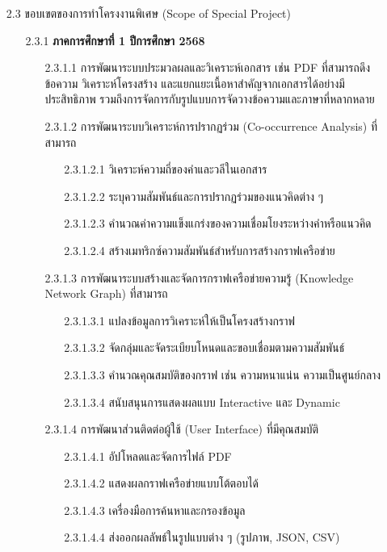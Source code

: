 \documentclass[12pt,a4paper]{article}
\newcommand{\textlight}[1]{{\thailightfont #1}}
\begin{document}
\begin{enumerate}[leftmargin=2cm]
    \item[2.3] ขอบเขตของการทำโครงงานพิเศษ (Scope of Special Project)
    \vspace{0.05cm}
    \textlight{
        \begin{enumerate}
            \item[2.3.1] \textbf{ภาคการศึกษาที่ 1 ปีการศึกษา 2568}
            \begin{enumerate}
                \item[2.3.1.1] การพัฒนาระบบประมวลผลและวิเคราะห์เอกสาร เช่น PDF ที่สามารถดึงข้อความ วิเคราะห์โครงสร้าง และแยกแยะเนื้อหาสำคัญจากเอกสารได้อย่างมีประสิทธิภาพ รวมถึงการจัดการกับรูปแบบการจัดวางข้อความและภาษาที่หลากหลาย
                \item[2.3.1.2] การพัฒนาระบบวิเคราะห์การปรากฏร่วม (Co-occurrence Analysis) ที่สามารถ
                \begin{enumerate}
                    \item[2.3.1.2.1] วิเคราะห์ความถี่ของคำและวลีในเอกสาร
                    \item[2.3.1.2.2] ระบุความสัมพันธ์และการปรากฏร่วมของแนวคิดต่าง ๆ
                    \item[2.3.1.2.3] คำนวณค่าความแข็งแกร่งของความเชื่อมโยงระหว่างคำหรือแนวคิด
                    \item[2.3.1.2.4] สร้างเมทริกซ์ความสัมพันธ์สำหรับการสร้างกราฟเครือข่าย
                \end{enumerate}
                \item[2.3.1.3] การพัฒนาระบบสร้างและจัดการกราฟเครือข่ายความรู้ (Knowledge Network Graph) ที่สามารถ
                \begin{enumerate}
                    \item[2.3.1.3.1] แปลงข้อมูลการวิเคราะห์ให้เป็นโครงสร้างกราฟ
                    \item[2.3.1.3.2] จัดกลุ่มและจัดระเบียบโหนดและขอบเชื่อมตามความสัมพันธ์
                    \item[2.3.1.3.3] คำนวณคุณสมบัติของกราฟ เช่น ความหนาแน่น ความเป็นศูนย์กลาง
                    \item[2.3.1.3.4] สนับสนุนการแสดงผลแบบ Interactive และ Dynamic
                \end{enumerate}
                \item[2.3.1.4] การพัฒนาส่วนติดต่อผู้ใช้ (User Interface) ที่มีคุณสมบัติ
                \begin{enumerate}
                    \item[2.3.1.4.1] อัปโหลดและจัดการไฟล์ PDF
                    \item[2.3.1.4.2] แสดงผลกราฟเครือข่ายแบบโต้ตอบได้
                    \item[2.3.1.4.3] เครื่องมือการค้นหาและกรองข้อมูล
                    \item[2.3.1.4.4] ส่งออกผลลัพธ์ในรูปแบบต่าง ๆ (รูปภาพ, JSON, CSV)
                \end{enumerate}
            \end{enumerate}
        \end{enumerate}

}
\end{enumerate}
\end{document}
